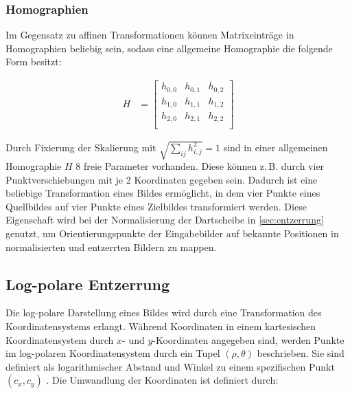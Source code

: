 \subsubsection{Homographien}
\label{sec:homographien}

Im Gegensatz zu affinen Transformationen können Matrixeinträge in Homographien beliebig sein, sodass eine allgemeine Homographie die folgende Form besitzt:

\begin{align*}
    H & =
    \left[
        \begin{array}{ccc}
            h_{0, 0} & h_{0, 1} & h_{0, 2} \\
            h_{1, 0} & h_{1, 1} & h_{1, 2} \\
            h_{2, 0} & h_{2, 1} & h_{2, 2} \\
        \end{array}
        \right]
\end{align*}

Durch Fixierung der Skalierung mit $\sqrt{\sum_{ij} h_{i, j}^2} = 1$ sind in einer allgemeinen Homographie $H$ 8 freie Parameter vorhanden. Diese können z.\,B. durch vier Punktverschiebungen mit je 2 Koordinaten gegeben sein. Dadurch ist eine beliebige Transformation eines Bildes ermöglicht, in dem vier Punkte eines Quellbildes auf vier Punkte eines Zielbildes transformiert werden. Diese Eigenschaft wird bei der Normalisierung der Dartscheibe in \autoref{sec:entzerrung} genutzt, um Orientierungspunkte der Eingabebilder auf bekannte Positionen in normalisierten und entzerrten Bildern zu mappen.


\subsection{Log-polare Entzerrung}
\label{sec:logpolare_entzerrung}

Die log-polare Darstellung eines Bildes wird durch eine Transformation des Koordinatensystems erlangt. Während Koordinaten in einem kartesischen Koordinatensystem durch $x$- und $y$-Koordinaten angegeben sind, werden Punkte im log-polaren Koordinatensystem durch ein Tupel $\left(\rho, \theta\right)$ beschrieben. Sie sind definiert als logarithmischer Abstand und Winkel zu einem spezifischen Punkt $\left(c_x, c_y\right)$ \cite{logpolar}. Die Umwandlung der Koordinaten ist definiert durch:

